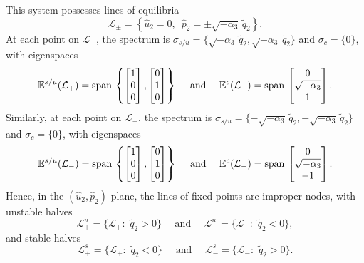 \documentclass[11pt]{article}
\numberwithin{equation}{section}
\begin{document}
This system possesses lines of equilibria
\begin{equation}
\label{eq:curvesL}
    \mathcal{L}_\pm = \left\{  \hat{u}_2 = 0,
\, \, \, 
\hat{p}_2 = \pm \sqrt{- \alpha_3}\, \tilde{q}_2  \right \}.
\end{equation}
At each point on $\mathcal{L}_+$, 
the spectrum is $\sigma_{s/u} = \{ \sqrt{-\alpha_3}\, \tilde{q}_2, \sqrt{-\alpha_3}\,\tilde{q}_2 \}$ and $\sigma_c= \{ 0 \}$, with eigenspaces
%
\[ 
\mathbb{E}^{s/u}(\mathcal L_+) = {\rm span} \, \left\{ \begin{bmatrix} 1 \\ 0 \\ 0 \end{bmatrix}, \begin{bmatrix} 0 \\ 1 \\ 0 \end{bmatrix} \right\} \quad \text{ and } \quad
\mathbb{E}^c (\mathcal L_+) = {\rm span} \, \begin{bmatrix} 0 \\ \sqrt{-\alpha_3} \\ 1 \end{bmatrix}. \]
%
Similarly, at each point on $\mathcal{L}_-$,
the spectrum is $\sigma_{s/u} = \{ -\sqrt{-\alpha_3}\, \tilde{q}_2, -\sqrt{-\alpha_3} \, \tilde{q}_2 \}$ and $\sigma_c= \{ 0 \}$, with eigenspaces
%
\[ 
\mathbb{E}^{s/u}(\mathcal L_-) = {\rm span} \, \left\{ \begin{bmatrix} 1 \\ 0 \\ 0 \end{bmatrix}, \begin{bmatrix} 0 \\ 1 \\ 0 \end{bmatrix} \right\}
\quad \text{ and } \quad
\mathbb{E}^c(\mathcal L_-) = {\rm span} \, \begin{bmatrix} 0 \\ \sqrt{-\alpha_3} \\ - 1 \end{bmatrix}.
\]
%
Hence, in the $(\hat{u}_2,\hat{p}_2)$ plane, the lines of fixed points are improper nodes,
with unstable halves 
%
\[
\mathcal{L}_+^u = \{ \mathcal{L}_+ :  \, \, \tilde{q}_2 > 0 \} 
\quad \text{ and } \quad
\mathcal{L}_-^u = \{ \mathcal{L}_- :  \, \, \tilde{q}_2 < 0 \},
\]
%
and stable halves
% 
\[ 
\mathcal{L}_+^s = \{ \mathcal{L}_+ :  \, \, \tilde{q}_2 < 0 \} \quad \text{ and } \quad
\mathcal{L}_-^s = \{ \mathcal{L}_- :  \, \, \tilde{q}_2 > 0 \}.
\]
%
\end{document}
